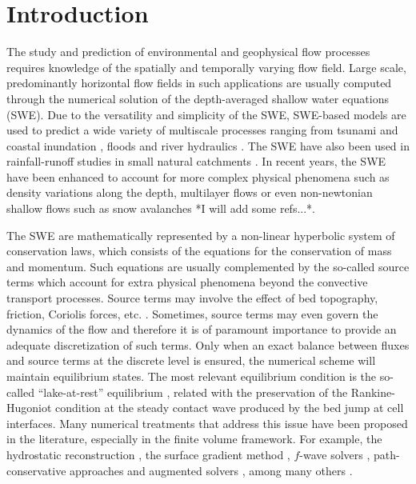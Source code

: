 \section{Introduction}

The study and prediction of environmental and geophysical flow processes requires knowledge of the spatially and temporally varying flow field.  Large scale, predominantly horizontal flow fields in such applications are usually computed through the numerical solution of the depth-averaged shallow water equations (SWE).  Due to the versatility and simplicity of the SWE, SWE-based models are used to predict a wide variety of multiscale processes ranging from tsunami and coastal inundation \cite{Marras:2016, Vater2019, Qin:2019}, floods \cite{George2011, Echeverribar2019} and river hydraulics \cite{Persi:2019}.  The SWE have also been used in rainfall-runoff studies in small natural catchments \cite{Mugler2011,   Lacasta2014, Simons2014, Xia2019, CaviedesVoullieme2020}. In recent years, the SWE have been enhanced to account for more complex physical phenomena such as density variations along the depth, multilayer flows or even non-newtonian shallow flows such as snow avalanches {*I will add some refs...*}.

The SWE are mathematically represented by a non-linear hyperbolic system of conservation laws, which consists of the equations for the conservation of mass and momentum. Such equations are usually complemented by the so-called source terms which account for extra physical phenomena beyond the convective transport processes. Source terms may involve the effect of bed topography, friction, Coriolis forces, etc. \cite{Kesserwani2013}. Sometimes, source terms may even govern the dynamics of the flow and therefore it is of paramount importance to provide an adequate discretization of such terms.  Only when an exact balance between fluxes and source terms at the discrete level  is ensured, the numerical scheme will maintain equilibrium states.  The most relevant equilibrium condition is the so-called ``lake-at-rest'' equilibrium \cite{bermude2}, related with the preservation of the Rankine-Hugoniot condition at the steady contact wave produced by the bed jump at cell interfaces.  Many numerical treatments that address this issue have been proposed in the literature, especially in the finite volume framework.  For example, the hydrostatic reconstruction \cite{audusse,xing2006}, the surface gradient method \cite{zhou}, $f$-wave solvers \cite{George:2008,LeVeque:2011}, path-conservative approaches \cite{Gosse:2001,  LeVeque:2011} and augmented solvers \cite{NavasMontilla2020}, among many others \cite{CALEFFI2016}.

